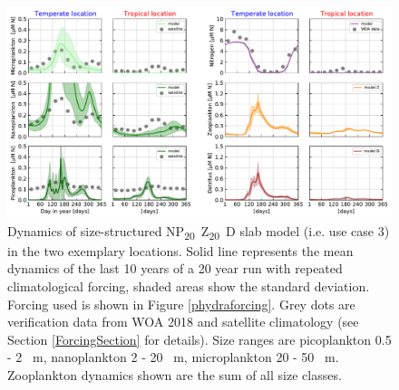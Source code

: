 \documentclass[template.tex]{subfiles}
\begin{document}
\begin{figure}[t]
\includegraphics[width=12cm]{Figures/firstdraft_plots/04_sizestruct_slab.pdf}
\caption{Dynamics of size-structured \unit{NP_{20}Z_{20}D} slab model (i.e. use case 3) in the two exemplary locations. Solid line represents the mean dynamics of the last 10 years of a 20 year run with repeated climatological forcing, shaded areas show the standard deviation. Forcing used is shown in Figure \ref{phydraforcing}. Grey dots are verification data from WOA 2018 and satellite climatology (see Section \ref{ForcingSection} for details). Size ranges are picoplankton 0.5 - 2 \unit{\mu m}, nanoplankton 2 - 20 \unit{\mu m}, microplankton 20 - 50 \unit{\mu m}. Zooplankton dynamics shown are the sum of all size classes.}
\label{SizeStructuredSlab_results}
\end{figure}

\clearpage

\biblio
\end{document}
